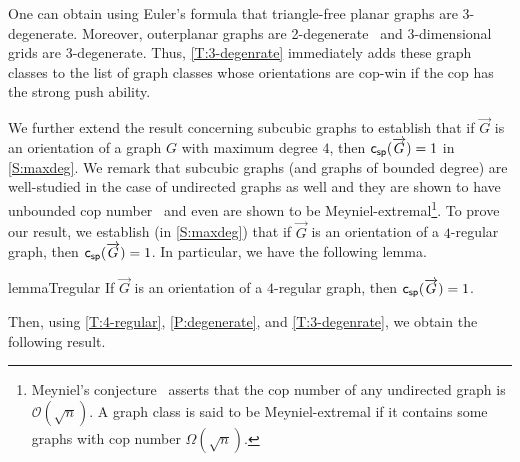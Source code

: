 \documentclass[a4paper,12pt]{amsart}
\newtheorem{corollary}[theorem]{Corollary}
\newcommand{\csp}[1]{{\sf c_{sp}}(\overrightarrow{#1})}
\begin{document}
One can obtain using Euler's formula that triangle-free planar graphs are 3-degenerate. Moreover, outerplanar graphs are 2-degenerate~\cite{outDegenerate} and 3-dimensional grids are 3-degenerate. Thus, \cref{T:3-degenrate} immediately adds these graph classes to the list of graph classes whose orientations are cop-win if the cop has the strong push ability.





We further extend the result concerning subcubic graphs to establish that if $\overrightarrow{G}$ is an orientation of a graph $G$ with maximum degree $4$, then $\csp{G} = 1$ in \cref{S:maxdeg}.  We remark that subcubic graphs (and graphs of bounded degree) are well-studied in the case of undirected graphs as well and they are shown to have unbounded cop number~\cite{hosseini2021meyniel} and even are shown to be Meyniel-extremal\footnote{Meyniel's conjecture~\cite{frankl1987cops} asserts that the cop number of any undirected graph is $\mathcal{O}(\sqrt{n})$. A graph class is said to be Meyniel-extremal if it contains some graphs with cop number $\Omega(\sqrt{n})$.}. 
To prove our result, we establish (in \cref{S:maxdeg}) that if $\overrightarrow{G}$ is an orientation of a $4$-regular graph, then $\csp{G} =1$. In particular, we have the following lemma. 


\begin{restatable}{lemma}{Tregular}\label{T:4-regular}
    If $\overrightarrow{G}$ is an orientation of a $4$-regular graph, then $\csp{G} = 1$.
\end{restatable}


Then, using \cref{T:4-regular}, \cref{P:degenerate}, and \cref{T:3-degenrate}, we obtain the following result.
\end{document}
